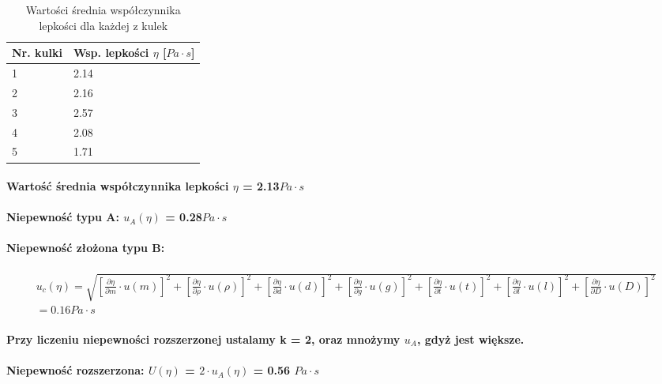 \documentclass[a4paper,12pt]{article}
\newenvironment{changemargin}[2]{%
\begin{list}{}{%
\setlength{\topsep}{0pt}%
\setlength{\leftmargin}{#1}%
\setlength{\rightmargin}{#2}%
\setlength{\listparindent}{\parindent}%
\setlength{\itemindent}{\parindent}%
\setlength{\parsep}{\parskip}%
}%
\item[]}{\end{list}}
\begin{document}
\begin{justify}
\begin{table}[H]
\begin{center}
\begin{scriptsize}
\begin{tabular}{|l|l|}
\hline
Nr. kulki & Wsp. lepkości $\eta$ [$Pa \cdot s$] \\
\hline
1 & 2.14 \\
\hline
2 & 2.16 \\
\hline
3 & 2.57 \\
\hline
4 & 2.08 \\
\hline
5 & 1.71 \\
\hline
\end{tabular}
\caption{Wartości średnia współczynnika lepkości dla każdej z kulek }
\label{table:2}
\end{scriptsize}
\end{center}
\end{table}

\paragraph{Wartość średnia współczynnika lepkości $\eta$ = 2.13$Pa \cdot s$}
\paragraph{Niepewność typu A: $u_{A}(\eta)$ = 0.28$Pa \cdot s$}
\paragraph{Niepewność złożona typu B: }
\begin{changemargin}{-2cm}{-2cm}
\begin{align*}
u_{c}(\eta) = \sqrt{[\frac{\partial \eta}{\partial m} \cdot u(m)]^2 + [\frac{\partial  \eta}{\partial \rho} \cdot u(\rho)]^2 + [\frac{\partial \eta}{\partial d} \cdot u(d)]^2 + [\frac{\partial \eta}{\partial g} \cdot u(g)]^2 + [\frac{\partial \eta}{\partial t} \cdot u(t)]^2 + [\frac{\partial \eta}{\partial l} \cdot u(l)]^2 + [\frac{\partial \eta}{\partial D} \cdot u(D)]^2}  \\ = 0.16 Pa \cdot s
\end{align*}
\end{changemargin}
\paragraph{Przy liczeniu niepewności rozszerzonej ustalamy k = 2, oraz mnożymy $u_{A}$, gdyż jest większe.}
\paragraph{Niepewność rozszerzona: $U(\eta)$ = $2 \cdot u_{A}(\eta)$ = 0.56 $Pa \cdot s$}

\end{justify}
\end{document}
